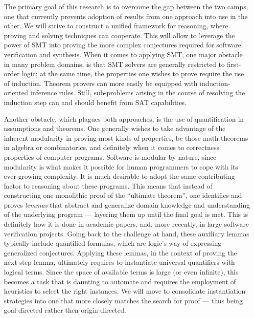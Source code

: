 \medskip
The primary goal of this research is to overcome the gap between the two camps,
one that currently prevents adoption of results from one approach into use in
the other.
We will strive to construct a unified framework for reasoning, where proving
and solving techniques can cooperate.
This will allow to leverage the power of SMT into proving the more complex
conjectures required for software verification and synthesis.
When it comes to applying SMT, one major obstacle in many problem domains, is
that SMT solvers are generally restricted to first-order logic; at the same time,
the properties one wishes to prove require the use of induction.
Theorem provers can more easily be equipped with induction-oriented inference
rules.
Still, sub-problems arising in the course of resolving the induction step can
and should benefit from SAT capabilities.

Another obstacle, which plagues both approaches, is the use of quantification
in assumptions and theorems.
One generally wishes to take advantage of the inherent modularity in proving
most kinds of properties, be those math theorems in algebra or combinatorics,
and definitely when it comes to correctness properties of computer programs.
Software is modular by nature, since modularity is what makes it possible
for human programmers to cope with its ever-growing complexity.
It is much desirable to adopt the same contributing factor to reasoning about
these programs.
This means that instead of constructing one monolithic proof of the ``ultimate
theorem'', one identifies and proves \emph{lemmas} that abstract and generalize
domain knowledge and understanding of the underlying program --- layering them
up until the final goal is met.
This is definitely how it is done in academic papers, and, more recently, in
large software verification projects.
Going back to the challenge at hand, these auxiliary lemmas typically include
quantified formulas, which are logic's way of expressing generalized conjectures.
Applying these lemmas, \eg in the context of proving the next-step lemma,
ultimately requires to instantiate universal quantifiers with logical terms.
Since the space of available terms is large (or even infinite), this becomes
a task that is daunting to automate and requires the employment of heuristics
to select the right instances.
We will move to consolidate instantiation strategies into one that more closely
matches the search for proof --- thus being goal-directed rather then origin-directed.


